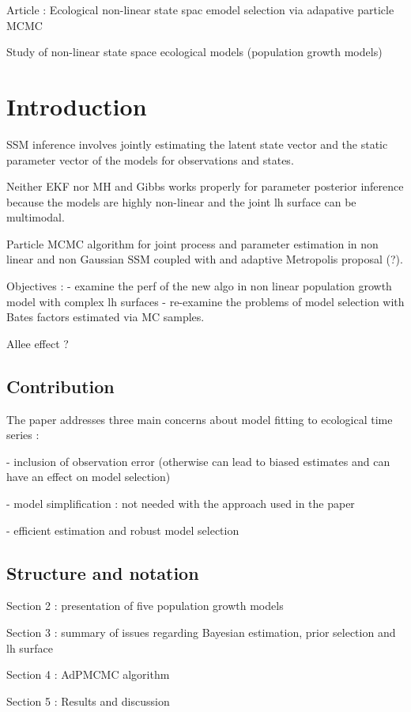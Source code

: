\documentclass[10pt,a4paper]{article}
\author{Nicolas Schreuder, Samuel Ritchie, Sholom Schechtman}
\begin{document}
Article : Ecological non-linear state spac emodel selection via adapative particle MCMC

Study of non-linear state space ecological models (population growth models)

\section{Introduction}

SSM inference involves jointly estimating the latent state vector and the static parameter vector
of the models for observations and states.

Neither EKF nor MH and Gibbs works properly for parameter posterior inference because
the models are highly non-linear and the joint lh surface can be multimodal.

Particle MCMC algorithm for joint process and parameter estimation in non linear and non Gaussian SSM
coupled with and adaptive Metropolis proposal (?).

Objectives :
- examine the perf of the new algo in non linear population growth model with complex lh surfaces
- re-examine the problems of model selection with Bates factors estimated via MC samples.

Allee effect ?

\subsection{Contribution}

The paper addresses three main concerns about model fitting to ecological time series :

- inclusion of observation error (otherwise can lead to biased estimates and can have an effect on model selection)

- model simplification : not needed with the approach used in the paper

- efficient estimation and robust model selection

\subsection{Structure and notation}
Section 2 : presentation of five population growth models

Section 3 : summary of issues regarding Bayesian estimation, prior selection and lh surface

Section 4 : AdPMCMC algorithm

Section 5 : Results and discussion
\end{document}
